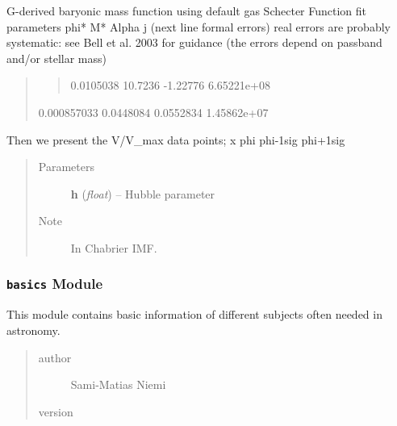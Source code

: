 \documentclass[letterpaper,10pt,english]{sphinxmanual}
\begin{document}

\begin{fulllineitems}
\label{SamPy.astronomy:SamPy.astronomy.baryons.BellBaryonicMassFunction}
G-derived baryonic mass function using default gas
Schecter Function fit parameters
phi* M* Alpha j  (next line formal errors)
real errors are probably systematic: see Bell et al. 2003 for
guidance (the errors depend on passband and/or stellar mass)
\begin{quote}
\begin{quote}

0.0105038      10.7236     -1.22776  6.65221e+08
\end{quote}

0.000857033    0.0448084    0.0552834  1.45862e+07
\end{quote}

Then we present the V/V\_max data points; x   phi  phi-1sig  phi+1sig
\begin{quote}\begin{description}
\item[{Parameters}] \leavevmode
\textbf{h} (\emph{float}) -- Hubble parameter

\item[{Note }] \leavevmode
In Chabrier IMF.

\end{description}\end{quote}

\end{fulllineitems}



\subsubsection{\texttt{basics} Module}
\label{SamPy.astronomy:module-SamPy.astronomy.basics}\label{SamPy.astronomy:basics-module}
This module contains basic information of different
subjects often needed in astronomy.
\begin{quote}\begin{description}
\item[{author}] \leavevmode
Sami-Matias Niemi

\item[{version}] 

\end{description}\end{quote}
\end{document}
